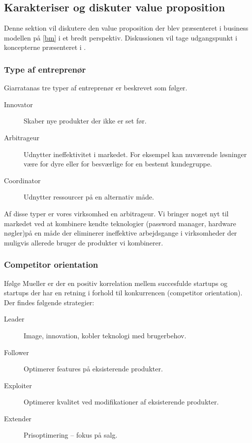 \subsection{Karakteriser og diskuter value proposition}

Denne sektion vil diskutere den value proposition der blev præsenteret i business modellen på \cref{bm} i et bredt perspektiv.
Diskussionen vil tage udgangspunkt i koncepterne præsenteret i \citet[p.~40]{rose2012software}.

\subsubsection{Type af entreprenør}
Giarratanas tre typer af entreprenør er beskrevet som følger.

\begin{description}
	\item[Innovator] Skaber nye produkter der ikke er set før.
	\item [Arbitrageur] Udnytter ineffektivitet i markedet. For eksempel kan nuværende løsninger være for dyre eller for besværlige for en bestemt kundegruppe.
	\item [Coordinator] Udnytter ressourcer på en alternativ måde.
\end{description}

Af disse typer er vores virksomhed en arbitrageur.
Vi bringer noget nyt til markedet ved at kombinere kendte teknologier (password manager, hardware nøgler)på en måde der eliminerer ineffektive arbejdsgange i virksomheder der muligvis allerede bruger de produkter vi kombinerer.

\subsubsection{Competitor orientation}
Ifølge Mueller \citep[p.~40]{rose2012software} er der en positiv korrelation mellem succesfulde startups og startups der har en retning i forhold til konkurrencen (competitor orientation).
Der findes følgende strategier:
\begin{description}
	\item[Leader] Image, innovation, kobler teknologi med brugerbehov.
	\item[Follower] Optimerer features på eksisterende produkter.
	\item [Exploiter] Optimerer kvalitet ved modifikationer af eksisterende produkter.
	\item [Extender] Prisoptimering -- fokus på salg.
\end{description}

